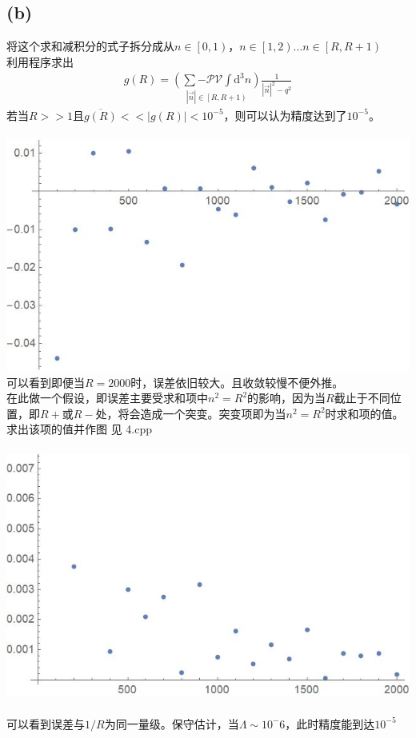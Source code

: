 \documentclass{article}
\numberwithin{equation}{section}
\begin{document}
\subsection*{(b)}
将这个求和减积分的式子拆分成从$n\in \left[0,1\right)$，$n\in \left[1,2\right)$...$n\in \left[R,R+1\right)$\\
利用程序求出
\begin{align}
    g\left(R\right)=\underset{\left|\vec{n}\right|\in\left[R,R+1\right)}{\left(\sum-\mathcal{PV}\int\mathrm{d}^3n\right)}\frac{1}{\left|\vec{n}\right|^2-q^2}
\end{align}
若当$R>>1$且$\overline{g\left(R\right)}<<\left|g\left(R\right)\right|<10^{-5}$，则可以认为精度达到了$10^{-5}$。\\
\\
\includegraphics[scale=0.4]{assets/4(c)1.jpg}
\\
可以看到即便当$R=2000$时，误差依旧较大。且收敛较慢不便外推。\\
在此做一个假设，即误差主要受求和项中$n^2=R^2$的影响，因为当$R$截止于不同位置，即$R+$或$R-$处，将会造成一个突变。突变项即为当$n^2=R^2$时求和项的值。\\
求出该项的值并作图 见 4.cpp\\
\\
\includegraphics[scale=0.4]{assets/4(c)2.jpg}\\
\\
可以看到误差与$1/R$为同一量级。保守估计，当$\Lambda\sim 10^-6$，此时精度能到达$10^{-5}$
\end{document}
